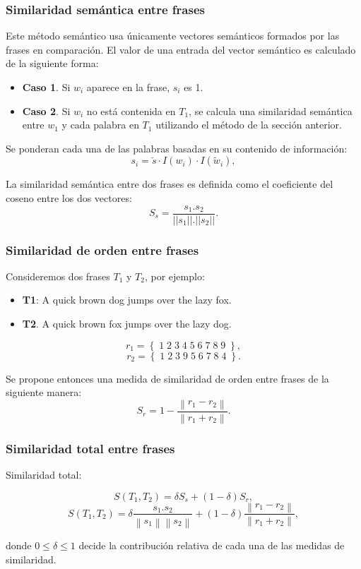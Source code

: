 \begin{frame}
	\frametitle{Similaridad semántica entre frases}
	Este método semántico usa únicamente vectores semánticos formados por las frases en comparación. El valor de una entrada del vector semántico es calculado de la siguiente forma:
	\begin{itemize}
		\item \textbf{Caso 1}. Si \(w_i\) aparece en la frase, \(s_i\) es 1.
		\item \textbf{Caso 2}. Si \(w_i\) no está contenida en \(T_1\), se calcula una similaridad semántica entre \(w_1\) y cada palabra en \(T_1\) utilizando el método de la sección anterior.
	\end{itemize}


	Se ponderan cada una de las palabras basadas en su contenido de información:
	\[s_i = \check{s} \cdot I(w_i) \cdot I(\widetilde{w}_i),\]

	La similaridad semántica entre dos frases es definida como el coeficiente del coseno entre los dos vectores:
	\[S_s = \frac{s_1. s_2}{||s_1||.||s_2||}.\]
\end{frame}

\begin{frame}
	\frametitle{Similaridad de orden entre frases}

	Consideremos dos frases \(T_1\) y \(T_2\), por ejemplo:
	\begin{itemize}
		\item \textbf{T1}: A quick brown dog jumps over the lazy fox.
		\item \textbf{T2}. A quick brown fox jumps over the lazy dog.
	\end{itemize}

	\[r_1 = \left \{\;1\;2\;3\;4\;5\;6\;7\;8\;9\;\right \},\]
	\[r_2 = \left \{\;1\;2\;3\;9\;5\;6\;7\;8\;4\;\right \}.\]

	Se propone entonces una medida de similaridad de orden entre frases de la siguiente manera:
	\[S_r = 1 - \frac{\left \| r_1 - r_2 \right \|}{\left \| r_1 + r_2 \right \|}.\]
\end{frame}

\begin{frame}
	\frametitle{Similaridad total entre frases}
	Similaridad total:

	\bigskip
	\[S(T_1, T_2)=\delta S_s + (1 - \delta)S_r,\]
	\[S(T_1, T_2)=\delta \frac{s_1.s_2}{\left \| s_1 \right \|\left \| s_2 \right \|} + (1 - \delta)\frac{\left \|r_1-r_2 \right \|}{\left \| r_1+r_2 \right \|},\]

	\bigskip
	donde \(0 \leq \delta \leq 1\) decide la contribución relativa de cada una de las medidas de similaridad.
\end{frame}

